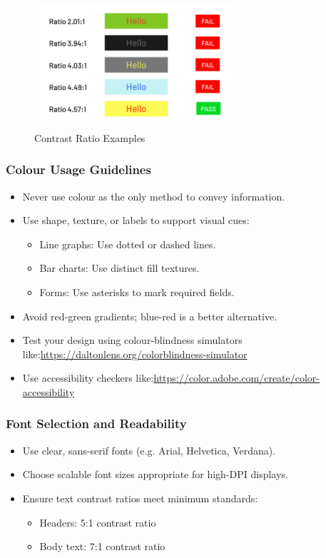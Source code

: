 \documentclass{article}
\begin{document}
\begin{figure}[h]
    \centering
    \includegraphics[width=0.7\textwidth]{contrast.png}
    \caption{Contrast Ratio Examples}
    \label{fig:your-label}
\end{figure}

\subsubsection{Colour Usage Guidelines}
\begin{itemize}
  \item Never use colour as the only method to convey information.
  \item Use shape, texture, or labels to support visual cues:
    \begin{itemize}
      \item Line graphs: Use dotted or dashed lines.
      \item Bar charts: Use distinct fill textures.
      \item Forms: Use asterisks to mark required fields.
    \end{itemize}
  \item Avoid red-green gradients; blue-red is a better alternative.
  \item Test your design using colour-blindness simulators like:\newline\url{https://daltonlens.org/colorblindness-simulator}
  \item Use accessibility checkers like:\newline\url{https://color.adobe.com/create/color-accessibility}
\end{itemize}

\subsubsection{Font Selection and Readability}
\begin{itemize}
  \item Use clear, sans-serif fonts (e.g. Arial, Helvetica, Verdana).
  \item Choose scalable font sizes appropriate for high-DPI displays.
  \item Ensure text contrast ratios meet minimum standards:
    \begin{itemize}
      \item Headers: 5:1 contrast ratio
      \item Body text: 7:1 contrast ratio
    \end{itemize}
\end{itemize}
\end{document}
